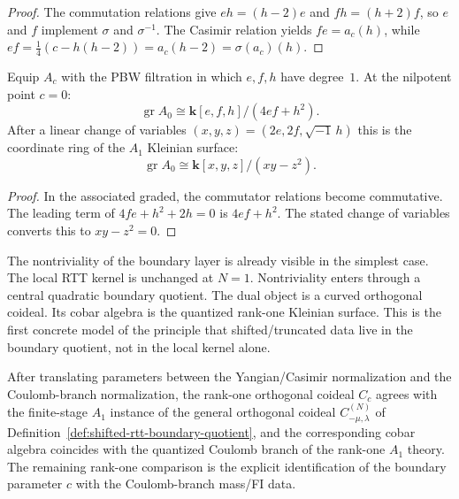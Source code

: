 \begin{proof}
The commutation relations give $eh = (h-2)e$ and $fh = (h+2)f$,
so $e$ and $f$ implement $\sigma$ and $\sigma^{-1}$. The Casimir
relation yields $fe = a_c(h)$, while
$ef = \tfrac{1}{4}(c - h(h-2)) = a_c(h-2) = \sigma(a_c)(h)$.
\end{proof}

\begin{theorem}
\label{thm:shifted-rtt-kleinian}
Equip $A_c$ with the PBW filtration in which $e, f, h$ have
degree~$1$. At the nilpotent point $c = 0$:
\[
\operatorname{gr} A_0
\cong \mathbf{k}[e,f,h]/(4ef + h^2).
\]
After a linear change of variables
$(x,y,z) = (2e, 2f, \sqrt{-1}\,h)$ this is the coordinate ring of the
$A_1$ Kleinian surface:
\[
\operatorname{gr} A_0
\cong \mathbf{k}[x,y,z]/(xy - z^2).
\]
\end{theorem}

\begin{proof}
In the associated graded, the commutator relations become
commutative. The leading term of $4fe + h^2 + 2h = 0$ is
$4ef + h^2$. The stated change of variables converts this to
$xy - z^2 = 0$.
\end{proof}

\begin{remark}
\label{rem:rank-one-lesson}
The nontriviality of the boundary layer is already visible in the
simplest case. The local RTT kernel is unchanged at $N = 1$.
Nontriviality enters through a central quadratic boundary quotient.
The dual object is a curved orthogonal coideal. Its cobar algebra is
the quantized rank-one Kleinian surface. This is the first concrete
model of the principle that shifted/truncated data live in the
boundary quotient, not in the local kernel alone.
\end{remark}

\begin{conjecture}
\label{conj:shifted-rtt-bfn-matching}
After translating parameters between the Yangian/Casimir normalization
and the Coulomb-branch normalization, the rank-one orthogonal coideal
$C_c$ agrees with the finite-stage $A_1$ instance of the general
orthogonal coideal $C_{-\mu,\lambda}^{(N)}$ of
Definition~\textup{\ref{def:shifted-rtt-boundary-quotient}},
and the corresponding cobar algebra coincides with the quantized
Coulomb branch of the rank-one $A_1$ theory. The remaining rank-one
comparison is the explicit identification of the
boundary parameter $c$ with the Coulomb-branch mass/FI data.
\end{conjecture}

